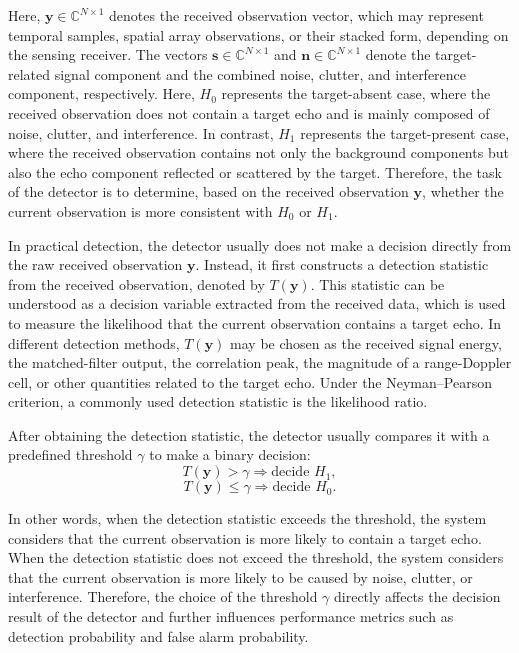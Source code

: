 Here, \(\mathbf{y}\in\mathbb{C}^{N\times 1}\) denotes the received observation vector,
which may represent temporal samples, spatial array observations, or their stacked form,
depending on the sensing receiver.
The vectors \(\mathbf{s}\in\mathbb{C}^{N\times 1}\) and
\(\mathbf{n}\in\mathbb{C}^{N\times 1}\) denote the target-related signal component
and the combined noise, clutter, and interference component, respectively.
Here, \(H_0\) represents the target-absent case, where the received observation
does not contain a target echo and is mainly composed of noise, clutter, and
interference.
In contrast, \(H_1\) represents the target-present case, where the received
observation contains not only the background components but also the echo
component reflected or scattered by the target.
Therefore, the task of the detector is to determine, based on the received
observation \(\mathbf{y}\), whether the current observation is more consistent
with \(H_0\) or \(H_1\).

In practical detection, the detector usually does not make a decision directly
from the raw received observation \(\mathbf{y}\).
Instead, it first constructs a detection statistic from the received observation,
denoted by \(T(\mathbf{y})\).
This statistic can be understood as a decision variable extracted from the
received data, which is used to measure the likelihood that the current
observation contains a target echo.
In different detection methods, \(T(\mathbf{y})\) may be chosen as the received
signal energy, the matched-filter output, the correlation peak, the magnitude
of a range-Doppler cell, or other quantities related to the target echo.
Under the Neyman--Pearson criterion, a commonly used detection statistic is
the likelihood ratio.

After obtaining the detection statistic, the detector usually compares it with
a predefined threshold \(\gamma\) to make a binary decision:
\begin{equation}
    T(\mathbf{y})>\gamma \Rightarrow \text{decide } H_1,
    \label{eq:detection_decision_h1}
\end{equation}
\begin{equation}
    T(\mathbf{y})\leq\gamma \Rightarrow \text{decide } H_0.
    \label{eq:detection_decision_h0}
\end{equation}

In other words, when the detection statistic exceeds the threshold, the system
considers that the current observation is more likely to contain a target echo.
When the detection statistic does not exceed the threshold, the system considers
that the current observation is more likely to be caused by noise, clutter, or
interference.
Therefore, the choice of the threshold \(\gamma\) directly affects the decision
result of the detector and further influences performance metrics such as
detection probability and false alarm probability.

